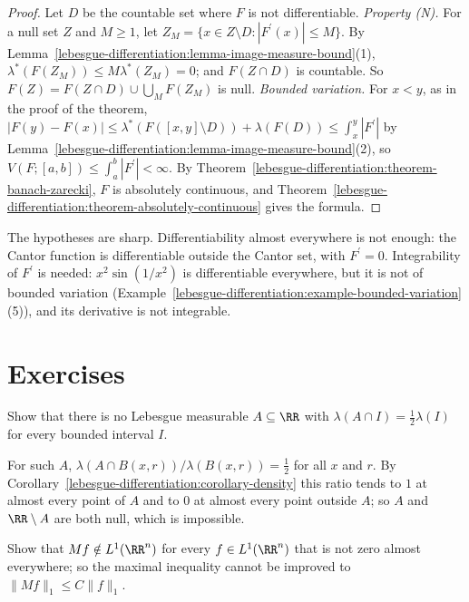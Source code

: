 \begin{proof}
Let $D$ be the countable set where $F$ is not differentiable. \emph{Property (N).} For a null set $Z$ and $M \geq 1$, let $Z_M = \{x \in Z \setminus D : |F^{\prime}(x)| \leq M\}$. By
Lemma~\ref{lebesgue-differentiation:lemma-image-measure-bound}(1), $\lambda^*(F(Z_M)) \leq M\lambda^*(Z_M) = 0$; and $F(Z \cap D)$ is countable. So $F(Z) = F(Z \cap D) \cup \bigcup_MF(Z_M)$ is null.
\emph{Bounded variation.} For $x < y$, as in the proof of the theorem, $|F(y) - F(x)| \leq \lambda^*(F([x, y] \setminus D)) + \lambda(F(D)) \leq \int_x^y|F^{\prime}|$ by
Lemma~\ref{lebesgue-differentiation:lemma-image-measure-bound}(2), so $V(F; [a, b]) \leq \int_a^b|F^{\prime}| < \infty$. By Theorem~\ref{lebesgue-differentiation:theorem-banach-zarecki}, $F$ is absolutely continuous, and
Theorem~\ref{lebesgue-differentiation:theorem-absolutely-continuous} gives the formula.
\end{proof}

The hypotheses are sharp. Differentiability almost everywhere is not enough: the Cantor function is differentiable outside the Cantor set, with $F^{\prime} = 0$. Integrability of $F^{\prime}$ is needed:
$x^2\sin(1/x^2)$ is differentiable everywhere, but it is not of bounded variation (Example~\ref{lebesgue-differentiation:example-bounded-variation}(5)), and its derivative is not integrable.

\section{Exercises}\label{lebesgue-differentiation:section-exercises}

\begin{exercise}\label{lebesgue-differentiation:exercise-no-half-density}
Show that there is no Lebesgue measurable $A \subseteq \RR$ with $\lambda(A \cap I) = \frac12\lambda(I)$ for every bounded interval $I$.
\end{exercise}

\begin{solution}
For such $A$, $\lambda(A \cap B(x, r))/\lambda(B(x, r)) = \frac12$ for all $x$ and $r$. By Corollary~\ref{lebesgue-differentiation:corollary-density} this ratio tends to $1$ at
almost every point of $A$ and to $0$ at almost every point outside $A$; so $A$ and $\RR \setminus A$ are both null, which is impossible.
\end{solution}

\begin{exercise}\label{lebesgue-differentiation:exercise-maximal-not-integrable}
Show that $Mf \notin L^1(\RR^n)$ for every $f \in L^1(\RR^n)$ that is not zero almost everywhere; so the maximal inequality cannot be improved to
$\|Mf\|_1 \leq C\|f\|_1$.
\end{exercise}

